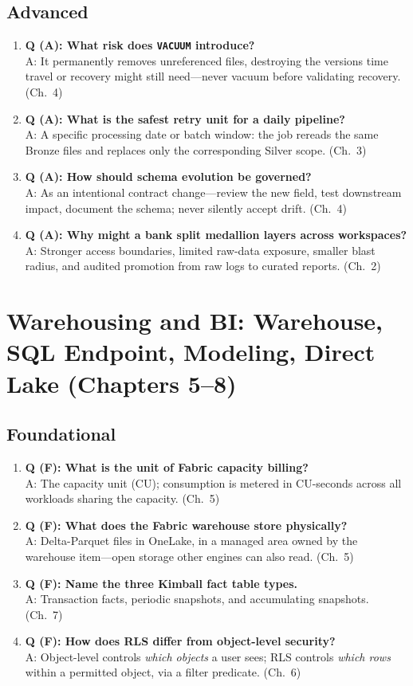 \subsection*{Advanced}
\begin{enumerate}
    \item \textbf{Q (A): What risk does \texttt{VACUUM} introduce?}\\
    A: It permanently removes unreferenced files, destroying the versions time travel or
    recovery might still need---never vacuum before validating recovery. (Ch.~4)
    \item \textbf{Q (A): What is the safest retry unit for a daily pipeline?}\\
    A: A specific processing date or batch window: the job rereads the same Bronze files and
    replaces only the corresponding Silver scope. (Ch.~3)
    \item \textbf{Q (A): How should schema evolution be governed?}\\
    A: As an intentional contract change---review the new field, test downstream impact,
    document the schema; never silently accept drift. (Ch.~4)
    \item \textbf{Q (A): Why might a bank split medallion layers across workspaces?}\\
    A: Stronger access boundaries, limited raw-data exposure, smaller blast radius, and audited
    promotion from raw logs to curated reports. (Ch.~2)
\end{enumerate}

\section{Warehousing and BI: Warehouse, SQL Endpoint, Modeling, Direct Lake (Chapters 5--8)}

\subsection*{Foundational}
\begin{enumerate}
    \item \textbf{Q (F): What is the unit of Fabric capacity billing?}\\
    A: The capacity unit (CU); consumption is metered in CU-seconds across all workloads
    sharing the capacity. (Ch.~5)
    \item \textbf{Q (F): What does the Fabric warehouse store physically?}\\
    A: Delta-Parquet files in OneLake, in a managed area owned by the warehouse item---open
    storage other engines can also read. (Ch.~5)
    \item \textbf{Q (F): Name the three Kimball fact table types.}\\
    A: Transaction facts, periodic snapshots, and accumulating snapshots. (Ch.~7)
    \item \textbf{Q (F): How does RLS differ from object-level security?}\\
    A: Object-level controls \emph{which objects} a user sees; RLS controls \emph{which rows}
    within a permitted object, via a filter predicate. (Ch.~6)
\end{enumerate}

